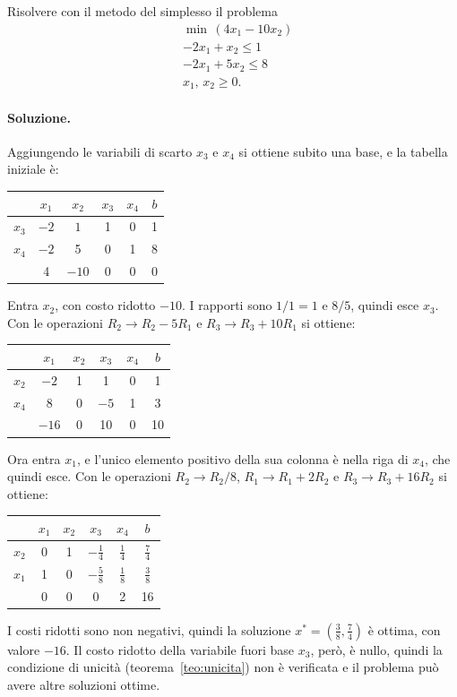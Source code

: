\begin{esercizio}
Risolvere con il metodo del simplesso il problema
\[
\begin{aligned}
&\min\, (4x_1 - 10x_2) \\
&{-2x_1} + x_2 \le 1 \\
&{-2x_1} + 5x_2 \le 8 \\
&x_1,\, x_2 \ge 0.
\end{aligned}
\]
\end{esercizio}

\paragraph{Soluzione.}
Aggiungendo le variabili di scarto $x_3$ e $x_4$ si ottiene subito una base, e la tabella iniziale è:
\begin{center}
\begin{tabular}{c|cccc|c}
 & $x_1$ & $x_2$ & $x_3$ & $x_4$ & $b$ \\
\hline
$x_3$ & $-2$ & $\boxed{1}$ & 1 & 0 & 1 \\
$x_4$ & $-2$ & 5 & 0 & 1 & 8 \\
\hline
 & 4 & $-10$ & 0 & 0 & 0 \\
\end{tabular}
\end{center}
Entra $x_2$, con costo ridotto $-10$. I rapporti sono $1/1 = 1$ e $8/5$, quindi esce $x_3$. Con le operazioni $R_2 \to R_2 - 5R_1$ e $R_3 \to R_3 + 10R_1$ si ottiene:
\begin{center}
\begin{tabular}{c|cccc|c}
 & $x_1$ & $x_2$ & $x_3$ & $x_4$ & $b$ \\
\hline
$x_2$ & $-2$ & 1 & 1 & 0 & 1 \\
$x_4$ & $\boxed{8}$ & 0 & $-5$ & 1 & 3 \\
\hline
 & $-16$ & 0 & 10 & 0 & 10 \\
\end{tabular}
\end{center}
Ora entra $x_1$, e l'unico elemento positivo della sua colonna è nella riga di $x_4$, che quindi esce. Con le operazioni $R_2 \to R_2/8$, $R_1 \to R_1 + 2R_2$ e $R_3 \to R_3 + 16R_2$ si ottiene:
\begin{center}
\begin{tabular}{c|cccc|c}
 & $x_1$ & $x_2$ & $x_3$ & $x_4$ & $b$ \\
\hline
$x_2$ & 0 & 1 & $-\frac14$ & $\frac14$ & $\frac74$ \\
$x_1$ & 1 & 0 & $-\frac58$ & $\frac18$ & $\frac38$ \\
\hline
 & 0 & 0 & 0 & 2 & 16 \\
\end{tabular}
\end{center}
I costi ridotti sono non negativi, quindi la soluzione $x^* = (\frac38, \frac74)$ è ottima, con valore $-16$. Il costo ridotto della variabile fuori base $x_3$, però, è nullo, quindi la condizione di unicità (teorema~\ref{teo:unicita}) non è verificata e il problema può avere altre soluzioni ottime.

